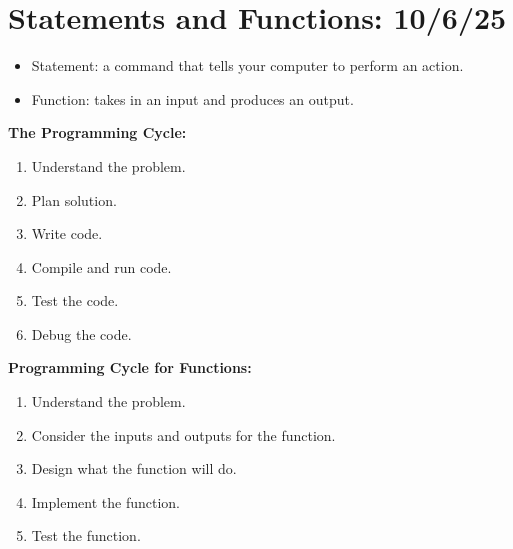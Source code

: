 \documentclass[11pt]{article}
\begin{document}
\section{Statements and Functions: 10/6/25}
\begin{itemize}
    \item Statement: a command that tells your computer to perform an action.
    \item Function: takes in an input and produces an output.
\end{itemize}

\textbf{The Programming Cycle:}
\begin{enumerate}
    \item Understand the problem.
    \item Plan solution.
    \item Write code.
    \item Compile and run code.
    \item Test the code.
    \item Debug the code.
\end{enumerate}

\textbf{Programming Cycle for Functions:}
\begin{enumerate}
    \item Understand the problem.
    \item Consider the inputs and outputs for the function.
    \item Design what the function will do.
    \item Implement the function.
    \item Test the function.
\end{enumerate}
\end{document}
